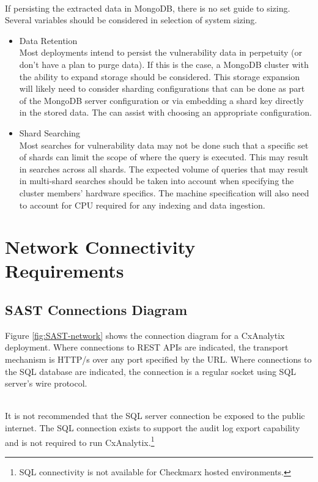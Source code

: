 \noindent\\If persisting the extracted data in MongoDB, there is no set guide to sizing. Several variables should be considered in selection of system sizing.

\begin{itemize}
    \item Data Retention\\
    Most deployments intend to persist the vulnerability data in perpetuity (or don't have a plan to purge data). 
    If this is the case, a MongoDB cluster with the ability to expand storage should be considered. This storage expansion will likely need to consider 
    sharding configurations that can be done as part of the MongoDB server configuration or via embedding a shard key directly in the stored data. 
    The  can assist with choosing an appropriate configuration.

    \item Shard Searching\\
    Most searches for vulnerability data may not be done such that a specific set of shards can limit the scope of where the query is executed. This may result
    in searches across all shards. The expected volume of queries that may result in multi-shard searches should be taken into account when specifying the 
    cluster members' hardware specifics. The machine specification will also need to account for CPU required for any indexing and data ingestion.
\end{itemize}

\section{Network Connectivity Requirements}

\subsection{SAST Connections Diagram}
Figure \ref{fig:SAST-network} shows the connection diagram for a CxAnalytix deployment. Where connections to REST APIs are indicated, the transport mechanism is 
HTTP/s over any port specified by the URL. Where connections to the SQL database are indicated, the connection is a regular socket using SQL server's wire protocol.

\noindent\\It is not recommended that the SQL server connection be exposed to the public internet. The SQL connection exists to support the audit log export capability 
and is not required to run CxAnalytix.\footnote{SQL connectivity is not available for Checkmarx hosted environments.}

